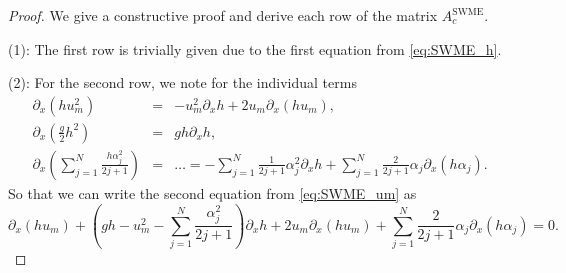 \documentclass[a4paper, 11pt]{article}
\begin{document}
\begin{proof}
    We give a constructive proof and derive each row of the matrix $A^{\textrm{SWME}}_{c}$.

    \noindent(1): The first row is trivially given due to the first equation from \eqref{eq:SWME_h}.

    \noindent(2): For the second row, we note for the individual terms
        \begin{eqnarray}
            \partial_x\left(h u_m^2\right)& =& -u_m^2 \partial_x h+2 u_m \partial_x\left(h u_m\right), \\
            \partial_x\left(\frac{g}{2} h^2\right)& =&g h \partial_x h, \\
            \partial_x\left(\sum_{j=1}^N \frac{h \alpha_j^2}{2 j+1}\right)& =&\ldots=-\sum_{j=1}^N \frac{1}{2 j+1} \alpha_j^2 \partial_x h+\sum_{j=1}^N \frac{2}{2 j+1} \alpha_j \partial_x\left(h \alpha_j\right).
        \end{eqnarray}
        So that we can write the second equation from \eqref{eq:SWME_um} as
        \begin{equation}
            \partial_{x}\left(h u_m\right)+\left(g h-u_m^2-\sum_{j=1}^N \frac{\alpha_j^2}{2j+1}\right) \partial_x h+2 u_m \partial_x\left(h u_m\right)+\sum_{j=1}^N \frac{2}{2 j+1} \alpha_j \partial_x\left(h \alpha_j\right)=0.
        \end{equation}


\end{proof}
\end{document}
